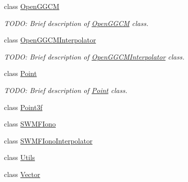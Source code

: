 \begin{DoxyCompactItemize}
class \hyperlink{classccmc_1_1_open_g_g_c_m}{Open\-G\-G\-C\-M}
\begin{DoxyCompactList}\small\item\em T\-O\-D\-O\-: Brief description of \hyperlink{classccmc_1_1_open_g_g_c_m}{Open\-G\-G\-C\-M} class. \end{DoxyCompactList}\item 
class \hyperlink{classccmc_1_1_open_g_g_c_m_interpolator}{Open\-G\-G\-C\-M\-Interpolator}
\begin{DoxyCompactList}\small\item\em T\-O\-D\-O\-: Brief description of \hyperlink{classccmc_1_1_open_g_g_c_m_interpolator}{Open\-G\-G\-C\-M\-Interpolator} class. \end{DoxyCompactList}\item 
class \hyperlink{classccmc_1_1_point}{Point}
\begin{DoxyCompactList}\small\item\em T\-O\-D\-O\-: Brief description of \hyperlink{classccmc_1_1_point}{Point} class. \end{DoxyCompactList}\item 
class \hyperlink{classccmc_1_1_point3f}{Point3f}
\item 
class \hyperlink{classccmc_1_1_s_w_m_f_iono}{S\-W\-M\-F\-Iono}
\item 
class \hyperlink{classccmc_1_1_s_w_m_f_iono_interpolator}{S\-W\-M\-F\-Iono\-Interpolator}
\item 
class \hyperlink{classccmc_1_1_utils}{Utils}
\item 
class \hyperlink{classccmc_1_1_vector}{Vector}
\end{DoxyCompactItemize}
